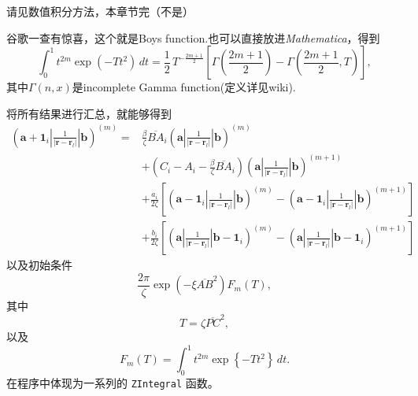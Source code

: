 \documentclass[12pt,a4paper,openany,twoside]{article}
\numberwithin{equation}{section}
\begin{document}
                请见数值积分方法，本章节完（不是）

                谷歌一查有惊喜，这个就是Boys function.也可以直接放进\emph{Mathematica}，得到
                \begin{equation}
                    \int _0^1 t^{2m} \exp(-Tt^2) \, dt = \frac{1}{2} \, T^{-\frac{2m+1}{2}}\left[\Gamma\left(\frac{2m+1}{2}\right) -  \Gamma\left(\frac{2m+1}{2},T\right)\right],
                \end{equation}
                其中$\Gamma(n,x)$是incomplete Gamma function(定义详见wiki).

                将所有结果进行汇总，就能够得到
                \begin{equation}
                    \begin{aligned}
                    (\boldsymbol{a} + \boldsymbol{1}_i|\frac{1}{|\boldsymbol{r}-\boldsymbol{r}_l|}|\boldsymbol{b})^{(m)} =  & \frac{\beta}{\zeta} \overline{BA}_i (\boldsymbol{a}|\frac{1}{|\boldsymbol{r}-\boldsymbol{r}_l|}|\boldsymbol{b})^{(m)} \\
                    & + \left(C_i - A_i - \frac{\beta}{\zeta} \overline{BA}_i \right) (\boldsymbol{a}|\frac{1}{|\boldsymbol{r}-\boldsymbol{r}_l|}|\boldsymbol{b})^{(m+1)} \\
                    & + \frac{a_i}{2\zeta}\left[(\boldsymbol{a} - \boldsymbol{1}_i|\frac{1}{|\boldsymbol{r}-\boldsymbol{r}_l|}|\boldsymbol{b})^{(m)}- (\boldsymbol{a} - \boldsymbol{1}_i|\frac{1}{|\boldsymbol{r}-\boldsymbol{r}_l|}|\boldsymbol{b})^{(m+1)}\right] \\
                    & + \frac{b_i}{2\zeta}\left[(\boldsymbol{a}|\frac{1}{|\boldsymbol{r}-\boldsymbol{r}_l|}|\boldsymbol{b}- \boldsymbol{1}_i)^{(m)}- (\boldsymbol{a}|\frac{1}{|\boldsymbol{r}-\boldsymbol{r}_l|}|\boldsymbol{b} - \boldsymbol{1}_i)^{(m+1)}\right]
                    \end{aligned}
                \end{equation}
                以及初始条件
                \begin{equation}
                    \frac{2\pi}{\zeta} \exp\left(- \xi \overline{AB}^2\right) F_m(T),
                \end{equation}
                其中
                \begin{equation}
                    T = \zeta \overline{PC}^2
                ,\end{equation}
                以及
                \begin{equation}
                    F_m (T) = \int ^1_0 t^{2m} \exp \left\{ - T t^2 \right\}  \, dt 
                .\end{equation}
                在程序中体现为一系列的 \lstinline$ZIntegral$ 函数。
\end{document}
